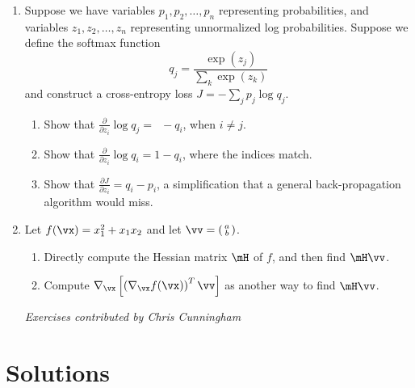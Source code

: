 \documentclass{article}
\newcommand{\twovector}[2]{ \begin{smallmatrix} #1 \\ #2 \end{smallmatrix} }
\newcommand{\ptwovector}[2]{ \left( \twovector{#1}{#2} \right) }
\begin{document}
\begin{enumerate}
\item \label{DFN_ex_gradientsimplification}
Suppose we have variables $p_1, p_2, \ldots, p_n$ representing probabilities, and variables $z_1, z_2, \ldots, z_n$ representing unnormalized log probabilities. Suppose we define the softmax function 
\begin{equation*}
    q_j = \frac{\exp(z_j)}{\sum_k \exp(z_k)}
\end{equation*}
and construct a cross-entropy loss $J = -\sum_j p_j \log q_j$. 

\begin{enumerate}
    \item Show that $\frac{\partial}{\partial z_i} \log q_j = \phantom{1}-q_i$, when $i \neq j$.
    \item Show that $\frac{\partial}{\partial z_i} \log q_i = 1 - q_i$, where the indices match.
    \item Show that $\frac{\partial J}{\partial z_i} = q_i - p_i$, a simplification that a general back-propagation algorithm would miss.
\end{enumerate}

\item \label{DFN_ex_Christianson}
Let $f(\vx) = x_1^2 + x_1x_2$ and let $\vv = \ptwovector{a}{b}$. 
\begin{enumerate}
    \item Directly compute the Hessian matrix $\mH$ of $f$, and then find $\mH \vv$.
    \item Compute $\nabla_\vx\left[ \left(\nabla_\vx f(\vx) \right)^T \vv\right]$ as another way to find $\mH \vv$.
\end{enumerate}

{\em Exercises contributed by Chris Cunningham}
\end{enumerate}


\section*{Solutions}
\end{document}
